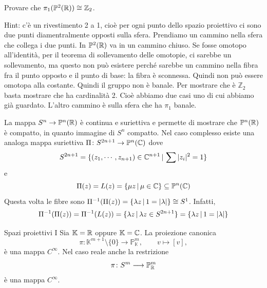 \documentclass[a4paper]{article}
\begin{document}
\begin{snippetexercise}{}
    Provare che \(\pi_1(\mathbb P^2(\mathbb{R})) \cong \mathbb Z_2\).
\end{snippetexercise}

\begin{snippetsolution}{}
    Hint: c'è un rivestimento 2 a 1, cioè per ogni punto dello spazio proiettivo
    ci sono due punti diamentralmente opposti sulla sfera.
    Prendiamo un cammino nella sfera che collega i due punti.
    In \(\mathbb P^2(\mathbb{R})\) va in un cammino chiuso.
    Se fosse omotopo all'identità, per il teorema di sollevamento delle omotopie,
    ci sarebbe un sollevamento, ma questo non può esistere perché sarebbe un cammino nella fibra
    fra il punto opposto e il punto di base: la fibra è sconnessa.
    Quindi non può essere omotopa alla costante.
    Quindi il gruppo non è banale.
    Per mostrare che è \(\mathbb Z_2\) basta mostrare che ha cardinalità 2.
    Cioè abbiamo due casi uno di cui abbiamo già guardato.
    L'altro cammino è sulla sfera che ha \(\pi_1\) banale.
\end{snippetsolution}

La mappa \(S^n \to \mathbb P^n(\mathbb{R})\) è continua e suriettiva e permette di mostrare che
\(\mathbb P^n(\mathbb{R})\) è compatto, in quanto immagine di \(S^n\) compatto.
Nel caso complesso esiste una analoga mappa suriettiva \(\Pi \colon S^{2n + 1} \to \mathbb P^n(\mathbb{C})\)
dove \[
    S^{2n+1} = \{
        (z_1, \cdots, z_{n+1}) \in \mathbb{C}^{n+1}
        \,|\, \sum |z_i|^2 = 1    
    \}
\]
e \[
    \Pi(z) = L(z)
    = \{
        \mu z \,|\, \mu \in \mathbb{C}    
    \} \subseteq \mathbb P^n(\mathbb{C})
\]
Questa volta le fibre sono
\(\Pi^{-1}(\Pi(z)) = \{\lambda z \,|\, 1 = |\lambda|\} \cong S^1\).
Infatti,
\[
    \Pi^{-1}(\Pi(z)) = \Pi^{-1}(L(z))
    = \{
        \lambda z \,|\,  \lambda z \in S^{2n+1}    
    \}
    = \{
        \lambda z \,|\, 1 = |\lambda|    
    \}
\]

\pagebreak



\begin{snippetproposition}{Spazi proiettivi I}
    Sia \(\mathbb{K}=\mathbb{R}\) oppure \(\mathbb{K}=\mathbb{C}\). La proiezione canonica
    \[
        \pi\colon \mathbb{K}^{m+1}\setminus\{0\}\longrightarrow
        \mathbb{P}^m_{\mathbb{K}},
        \qquad
        v\longmapsto [v],
    \]
    è una mappa \(C^\infty\). Nel caso reale anche la restrizione
    \[
        \pi\colon S^m\longrightarrow \mathbb{P}^m_{\mathbb{R}}
    \]
    è una mappa \(C^\infty\).
\end{snippetproposition}
\end{document}
